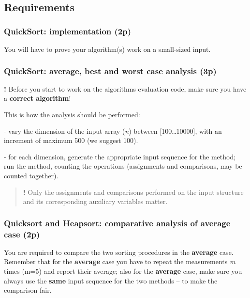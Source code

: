 \documentclass[../en-fa-lab.tex]{subfiles}
\begin{document}
\subsection{Requirements}\label{requirements}

\subsubsection{QuickSort: implementation
(2p)}\label{quicksort-implementation-2p}

You will have to prove your algorithm(s) work on a small-sized input.

\subsubsection{QuickSort: average, best and worst case analysis
(3p)}\label{quicksort-average-best-and-worst-case-analysis-3p}

\textbf{!} Before you start to work on the algorithms evaluation code,
make sure you have a \textbf{correct algorithm}!

This is how the analysis should be performed:

- vary the dimension of the input array (\emph{n}) between
{[}100\ldots10000{]}, with an increment of maximum 500 (we suggest 100).

- for each dimension, generate the appropriate input sequence for the
method; run the method, counting the operations (assignments and
comparisons, may be counted together).

\begin{quote}
\textbf{!} Only the assignments and comparisons performed on the input
structure and its corresponding auxiliary variables matter.
\end{quote}

\subsubsection{Quicksort and Heapsort: comparative analysis of average case
(2p)}\label{quicksort-and-heapsort-comparative-analysis-of-average-case-2p}

You are required to compare the two sorting procedures in the
\textbf{average} case. Remember that for the \textbf{average} case you
have to repeat the measurements \emph{m} times (m=5) and report their
average; also for the \textbf{average} case, make sure you always use
the \textbf{same} input sequence for the two methods -- to make the
comparison fair.
\end{document}
